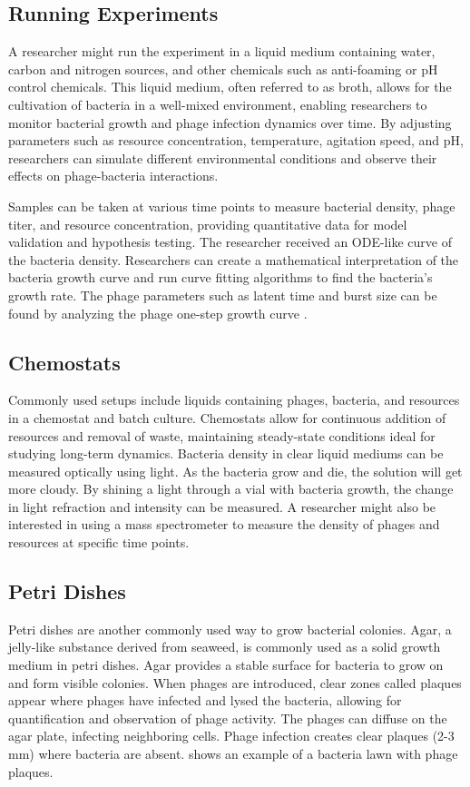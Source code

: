 \subsection{Running Experiments}
A researcher might run the experiment in a liquid medium containing water, carbon and nitrogen sources, and other chemicals such as anti-foaming or pH control chemicals. 
This liquid medium, often referred to as broth, allows for the cultivation of bacteria in a well-mixed environment, enabling researchers to monitor bacterial growth and phage infection dynamics over time. 
By adjusting parameters such as resource concentration, temperature, agitation speed, and pH, researchers can simulate different environmental conditions and observe their effects on phage-bacteria interactions. 

Samples can be taken at various time points to measure bacterial density, phage titer, and resource concentration, providing quantitative data for model validation and hypothesis testing. 
The researcher received an ODE-like curve of the bacteria density. 
Researchers can create a mathematical interpretation of the bacteria growth curve and run curve fitting algorithms to find the bacteria's growth rate. 
The phage parameters such as latent time and burst size can be found by analyzing the phage one-step growth curve \cite{gengUsingBacterialPopulation2024, mullaExtremeDiversityPhage2024}. 

\subsection{Chemostats}
Commonly used setups include liquids containing phages, bacteria, and resources in a chemostat and batch culture. 
Chemostats allow for continuous addition of resources and removal of waste, maintaining steady-state conditions ideal for studying long-term dynamics.
Bacteria density in clear liquid mediums can be measured optically using light. 
As the bacteria grow and die, the solution will get more cloudy. 
By shining a light through a vial with bacteria growth, the change in light refraction and intensity can be measured. 
A researcher might also be interested in using a mass spectrometer to measure the density of phages and resources at specific time points. 

\subsection{Petri Dishes}
Petri dishes are another commonly used way to grow bacterial colonies. 
Agar, a jelly-like substance derived from seaweed, is commonly used as a solid growth medium in petri dishes. 
Agar provides a stable surface for bacteria to grow on and form visible colonies. 
When phages are introduced, clear zones called plaques appear where phages have infected and lysed the bacteria, allowing for quantification and observation of phage activity. 
The phages can diffuse on the agar plate, infecting neighboring cells. 
Phage infection creates clear plaques (2-3 mm) where bacteria are absent. 
 shows an example of a bacteria lawn with phage plaques. 


